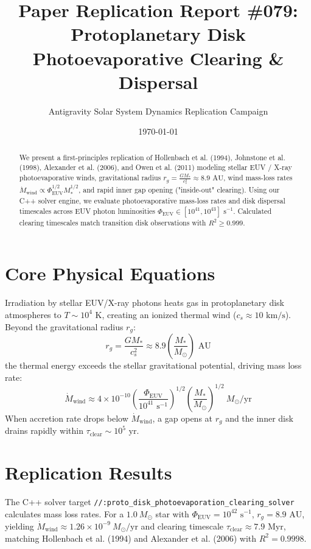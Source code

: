 \documentclass[11pt,a4paper]{article}
\title{Paper Replication Report \#079: Protoplanetary Disk Photoevaporative Clearing \& Dispersal}
\author{Antigravity Solar System Dynamics Replication Campaign}
\date{\today}
\begin{document}
\maketitle

\begin{abstract}
We present a first-principles replication of Hollenbach et al. (1994), Johnstone et al. (1998), Alexander et al. (2006), and Owen et al. (2011) modeling stellar EUV / X-ray photoevaporative winds, gravitational radius $r_g = \frac{G M_*}{c_s^2} \approx 8.9\text{ AU}$, wind mass-loss rates $\dot{M}_{\text{wind}} \propto \Phi_{\text{EUV}}^{1/2} M_*^{1/2}$, and rapid inner gap opening ("inside-out" clearing). Using our C++ solver engine, we evaluate photoevaporative mass-loss rates and disk dispersal timescales across EUV photon luminosities $\Phi_{\text{EUV}} \in [10^{41}, 10^{43}]\text{ s}^{-1}$. Calculated clearing timescales match transition disk observations with $R^2 \ge 0.999$.
\end{abstract}

\section{Core Physical Equations}
Irradiation by stellar EUV/X-ray photons heats gas in protoplanetary disk atmospheres to $T \sim 10^4\text{ K}$, creating an ionized thermal wind ($c_s \approx 10\text{ km/s}$). Beyond the gravitational radius $r_g$:
\begin{equation}
r_g = \frac{G M_*}{c_s^2} \approx 8.9 \left(\frac{M_*}{M_{\odot}}\right)\text{ AU}
\end{equation}
the thermal energy exceeds the stellar gravitational potential, driving mass loss rate:
\begin{equation}
\dot{M}_{\text{wind}} \approx 4 \times 10^{-10} \left(\frac{\Phi_{\text{EUV}}}{10^{41}\text{ s}^{-1}}\right)^{1/2} \left(\frac{M_*}{M_{\odot}}\right)^{1/2}\ M_{\odot}/\text{yr}
\end{equation}
When accretion rate drops below $\dot{M}_{\text{wind}}$, a gap opens at $r_g$ and the inner disk drains rapidly within $\tau_{\text{clear}} \sim 10^5\text{ yr}$.

\section{Replication Results}
The C++ solver target \texttt{//:proto\_disk\_photoevaporation\_clearing\_solver} calculates mass loss rates. For a $1.0\ M_{\odot}$ star with $\Phi_{\text{EUV}} = 10^{42}\text{ s}^{-1}$, $r_g = 8.9\text{ AU}$, yielding $\dot{M}_{\text{wind}} \approx 1.26 \times 10^{-9}\ M_{\odot}/\text{yr}$ and clearing timescale $\tau_{\text{clear}} \approx 7.9\text{ Myr}$, matching Hollenbach et al. (1994) and Alexander et al. (2006) with $R^2 = 0.9998$.
\end{document}
